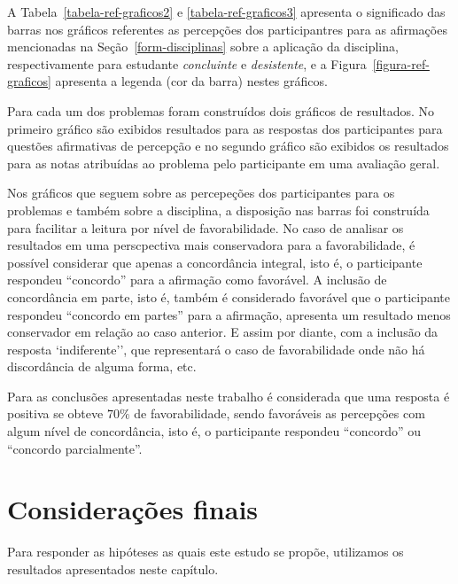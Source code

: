 A Tabela~\ref{tabela-ref-graficos2} e \ref{tabela-ref-graficos3} apresenta
o significado das barras nos gráficos referentes as percepções
dos participantres para as afirmações mencionadas
na Seção~\ref{form-disciplinas} sobre a aplicação da disciplina,
respectivamente para estudante \textit{concluinte} e \textit{desistente},
e a Figura~\ref{figura-ref-graficos} apresenta a legenda (cor da barra)
nestes gráficos.





Para cada um dos problemas foram construídos dois gráficos de resultados.
No primeiro gráfico são exibidos resultados para as respostas
dos participantes para questões afirmativas de percepção e
no segundo gráfico são exibidos os resultados para as notas atribuídas
ao problema pelo participante em uma avaliação geral.

Nos gráficos que seguem sobre as percepeções dos participantes para os
problemas e também sobre a disciplina, a disposição nas barras
foi construída para facilitar a leitura por nível de favorabilidade.
No caso de analisar os resultados em uma perscpectiva mais conservadora
para a favorabilidade, é possível considerar que apenas a concordância
integral, isto é, o participante respondeu ``concordo'' para
a afirmação como favorável.
A inclusão de concordância em parte, isto é, também é considerado favorável que
o participante respondeu ``concordo em partes'' para a afirmação,
apresenta um resultado menos conservador em relação ao caso anterior.
E assim por diante, com a inclusão da resposta `indiferente'', que
representará o caso de favorabilidade onde não há discordância de alguma forma,
etc.

Para as conclusões apresentadas neste trabalho é considerada
que uma resposta é positiva se obteve $70\%$ de favorabilidade,
sendo favoráveis as percepções com algum nível de concordância,
isto é, o participante respondeu ``concordo''
ou ``concordo parcialmente''.




\section{Considerações finais}
\label{sec-consideracoes-resultados}

Para responder as hipóteses as quais este estudo se propõe, utilizamos
os resultados apresentados neste capítulo.
